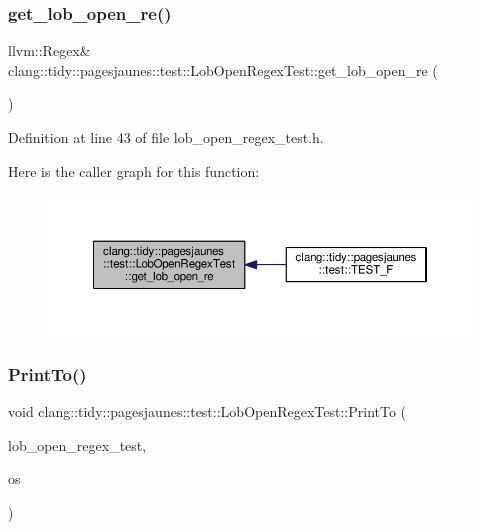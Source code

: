 \subsubsection{\texorpdfstring{get\+\_\+lob\+\_\+open\+\_\+re()}{get\_lob\_open\_re()}}
{\footnotesize\ttfamily llvm\+::\+Regex\& clang\+::tidy\+::pagesjaunes\+::test\+::\+Lob\+Open\+Regex\+Test\+::get\+\_\+lob\+\_\+open\+\_\+re (\begin{DoxyParamCaption}{ }\end{DoxyParamCaption})\hspace{0.3cm}{\ttfamily [inline]}}



Definition at line 43 of file lob\+\_\+open\+\_\+regex\+\_\+test.\+h.

Here is the caller graph for this function\+:
\nopagebreak
\begin{figure}[H]
\begin{center}
\leavevmode
\includegraphics[width=350pt]{classclang_1_1tidy_1_1pagesjaunes_1_1test_1_1_lob_open_regex_test_a7844f9ac141e0a257597bb6e44a169a3_icgraph}
\end{center}
\end{figure}
\mbox{\label{classclang_1_1tidy_1_1pagesjaunes_1_1test_1_1_lob_open_regex_test_a81edd389a0f8214a5b8f2f188c175bfd}} 
\subsubsection{\texorpdfstring{Print\+To()}{PrintTo()}}
{\footnotesize\ttfamily void clang\+::tidy\+::pagesjaunes\+::test\+::\+Lob\+Open\+Regex\+Test\+::\+Print\+To (\begin{DoxyParamCaption}\item[{const \hyperlink{classclang_1_1tidy_1_1pagesjaunes_1_1test_1_1_lob_open_regex_test}{Lob\+Open\+Regex\+Test} \&}]{lob\+\_\+open\+\_\+regex\+\_\+test,  }\item[{\+::std\+::ostream $\ast$}]{os }\end{DoxyParamCaption})}




